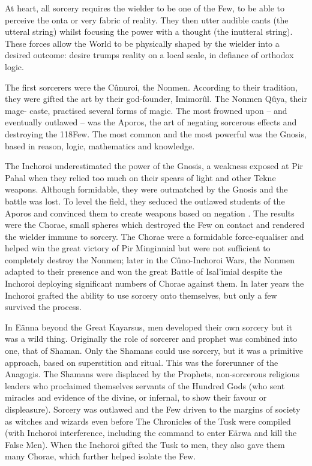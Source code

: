 \documentclass[]{book}
\begin{document}
At heart, all sorcery requires the wielder to be one of the Few, to be able to perceive the
onta or very fabric of reality. They then utter audible cants (the utteral string) whilst
focusing the power with a thought (the inutteral string). These forces allow the World
to be physically shaped by the wielder into a desired outcome: desire trumps reality on a
local scale, in defiance of orthodox logic.

The first sorcerers were the Cûnuroi, the Nonmen. According to their tradition, they
were gifted the art by their god-founder, Imimorûl. The Nonmen Qûya, their mage-
caste, practised several forms of magic. The most frowned upon -- and eventually
outlawed -- was the Aporos, the art of negating sorcerous effects and destroying the
118Few. The most common and the most powerful was the Gnosis, based in reason, logic,
mathematics and knowledge.

The Inchoroi underestimated the power of the Gnosis, a weakness exposed at Pir Pahal
when they relied too much on their spears of light and other Tekne weapons. Although
formidable, they were outmatched by the Gnosis and the battle was lost. To level the
field, they seduced the outlawed students of the Aporos and convinced them to create
weapons based on negation . The results were the Chorae, small spheres which
destroyed the Few on contact and rendered the wielder immune to sorcery. The Chorae
were a formidable force-equaliser and helped win the great victory of Pir Minginnial but
were not sufficient to completely destroy the Nonmen; later in the Cûno-Inchoroi
Wars, the Nonmen adapted to their presence and won the great Battle of Isal'imial
despite the Inchoroi deploying significant numbers of Chorae against them. In later
years the Inchoroi grafted the ability to use sorcery onto themselves, but only a few
survived the process.

In Eänna beyond the Great Kayarsus, men developed their own sorcery but it was a
wild thing. Originally the role of sorcerer and prophet was combined into one, that of
Shaman. Only the Shamans could use sorcery, but it was a primitive approach, based
on superstition and ritual. This was the forerunner of the Anagogis. The Shamans were
displaced by the Prophets, non-sorcerous religious leaders who proclaimed themselves
servants of the Hundred Gods (who sent miracles and evidence of the divine, or
infernal, to show their favour or displeasure). Sorcery was outlawed and the Few driven
to the margins of society as witches and wizards even before The Chronicles of the Tusk
were compiled (with Inchoroi interference, including the command to enter Eärwa and
kill the False Men). When the Inchoroi gifted the Tusk to men, they also gave them
many Chorae, which further helped isolate the Few.
\end{document}
